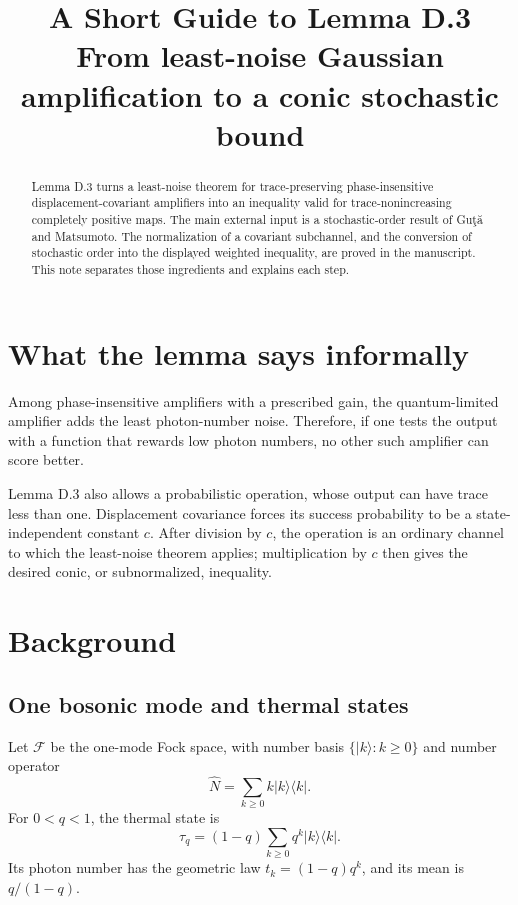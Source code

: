 \documentclass[11pt]{article}
\title{A Short Guide to Lemma D.3\\
\large From least-noise Gaussian amplification to a conic stochastic bound}
\author{}
\date{}
\newcommand{\F}{\mathcal F}
\newcommand{\ketbra}[1]{\lvert #1\rangle\!\langle #1\rvert}
\begin{document}
\maketitle

\begin{abstract}
Lemma D.3 turns a least-noise theorem for trace-preserving phase-insensitive
displacement-covariant amplifiers into an inequality valid for
trace-nonincreasing completely positive maps.  The main external input is a
stochastic-order result of Gu\c{t}\u{a} and Matsumoto.  The normalization of a
covariant subchannel, and the conversion of stochastic order into the
displayed weighted inequality, are proved in the manuscript.  This note
separates those ingredients and explains each step.
\end{abstract}

\section{What the lemma says informally}

Among phase-insensitive amplifiers with a prescribed gain, the
quantum-limited amplifier adds the least photon-number noise.  Therefore, if
one tests the output with a function that rewards low photon numbers, no
other such amplifier can score better.

Lemma D.3 also allows a probabilistic operation, whose output can have trace
less than one.  Displacement covariance forces its success probability to be
a state-independent constant $c$.  After division by $c$, the operation is
an ordinary channel to which the least-noise theorem applies; multiplication
by $c$ then gives the desired conic, or subnormalized, inequality.

\section{Background}

\subsection{One bosonic mode and thermal states}

Let $\F$ be the one-mode Fock space, with number basis
$\{\lvert k\rangle:k\geq0\}$ and number operator
\[
  \widehat N=\sum_{k\geq0}k\ketbra{k}.
\]
For $0<q<1$, the thermal state is
\begin{equation}\label{eq:thermal}
  \tau_q=(1-q)\sum_{k\geq0}q^k\ketbra{k}.
\end{equation}
Its photon number has the geometric law
$t_k=(1-q)q^k$, and its mean is $q/(1-q)$.
\end{document}
